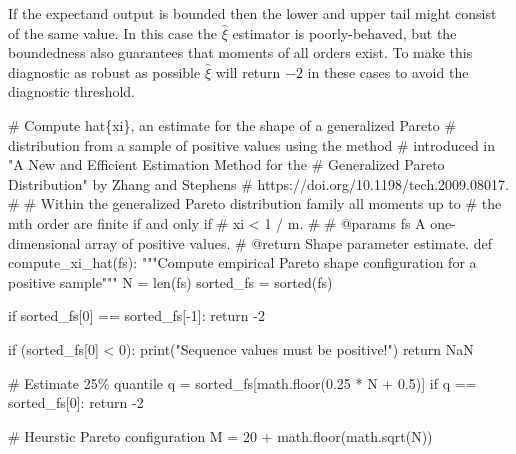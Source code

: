 \documentclass[
  letterpaper,
  DIV=11,
  numbers=noendperiod]{scrartcl}
\newenvironment{Shaded}{\begin{snugshade}}{\end{snugshade}}
\newcommand{\BuiltInTok}[1]{\textcolor[rgb]{0.00,0.23,0.31}{#1}}
\newcommand{\CommentTok}[1]{\textcolor[rgb]{0.37,0.37,0.37}{#1}}
\newcommand{\ControlFlowTok}[1]{\textcolor[rgb]{0.00,0.23,0.31}{#1}}
\newcommand{\DecValTok}[1]{\textcolor[rgb]{0.68,0.00,0.00}{#1}}
\newcommand{\FloatTok}[1]{\textcolor[rgb]{0.68,0.00,0.00}{#1}}
\newcommand{\KeywordTok}[1]{\textcolor[rgb]{0.00,0.23,0.31}{#1}}
\newcommand{\NormalTok}[1]{\textcolor[rgb]{0.00,0.23,0.31}{#1}}
\newcommand{\OperatorTok}[1]{\textcolor[rgb]{0.37,0.37,0.37}{#1}}
\newcommand{\StringTok}[1]{\textcolor[rgb]{0.13,0.47,0.30}{#1}}
\begin{document}
If the expectand output is bounded then the lower and upper tail might
consist of the same value. In this case the \(\hat{\xi}\) estimator is
poorly-behaved, but the boundedness also guarantees that moments of all
orders exist. To make this diagnostic as robust as possible
\(\hat{\xi}\) will return \(-2\) in these cases to avoid the diagnostic
threshold.

\begin{Shaded}
\begin{Highlighting}[]
\CommentTok{\# Compute hat\{xi\}, an estimate for the shape of a generalized Pareto }
\CommentTok{\# distribution from a sample of positive values using the method }
\CommentTok{\# introduced in "A New and Efficient Estimation Method for the }
\CommentTok{\# Generalized Pareto Distribution" by Zhang and Stephens }
\CommentTok{\# https://doi.org/10.1198/tech.2009.08017.}
\CommentTok{\# }
\CommentTok{\# Within the generalized Pareto distribution family all moments up to }
\CommentTok{\# the mth order are finite if and only if }
\CommentTok{\#  xi \textless{} 1 / m.}
\CommentTok{\#}
\CommentTok{\# @params fs A one{-}dimensional array of positive values.}
\CommentTok{\# @return Shape parameter estimate.}
\KeywordTok{def}\NormalTok{ compute\_xi\_hat(fs):}
  \CommentTok{"""Compute empirical Pareto shape configuration for a positive sample"""}
\NormalTok{  N }\OperatorTok{=} \BuiltInTok{len}\NormalTok{(fs)}
\NormalTok{  sorted\_fs }\OperatorTok{=} \BuiltInTok{sorted}\NormalTok{(fs)}
  
  \ControlFlowTok{if}\NormalTok{ sorted\_fs[}\DecValTok{0}\NormalTok{] }\OperatorTok{==}\NormalTok{ sorted\_fs[}\OperatorTok{{-}}\DecValTok{1}\NormalTok{]:}
    \ControlFlowTok{return} \OperatorTok{{-}}\DecValTok{2}
  
  \ControlFlowTok{if}\NormalTok{ (sorted\_fs[}\DecValTok{0}\NormalTok{] }\OperatorTok{\textless{}} \DecValTok{0}\NormalTok{):}
    \BuiltInTok{print}\NormalTok{(}\StringTok{"Sequence values must be positive!"}\NormalTok{)}
    \ControlFlowTok{return}\NormalTok{ NaN}
  
  \CommentTok{\# Estimate 25\% quantile}
\NormalTok{  q }\OperatorTok{=}\NormalTok{ sorted\_fs[math.floor(}\FloatTok{0.25} \OperatorTok{*}\NormalTok{ N }\OperatorTok{+} \FloatTok{0.5}\NormalTok{)]}
  \ControlFlowTok{if}\NormalTok{ q }\OperatorTok{==}\NormalTok{ sorted\_fs[}\DecValTok{0}\NormalTok{]:}
    \ControlFlowTok{return} \OperatorTok{{-}}\DecValTok{2}
    
  \CommentTok{\# Heurstic Pareto configuration}
\NormalTok{  M }\OperatorTok{=} \DecValTok{20} \OperatorTok{+}\NormalTok{ math.floor(math.sqrt(N))}
  

\end{Highlighting}
\end{Shaded}
\end{document}
